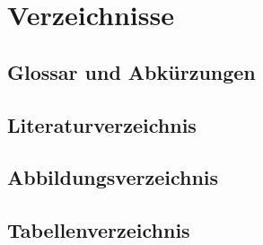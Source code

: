 \chapter{Verzeichnisse}


\section{Glossar und Abkürzungen}


\section{Literaturverzeichnis}


\section{Abbildungsverzeichnis}


\section{Tabellenverzeichnis}


